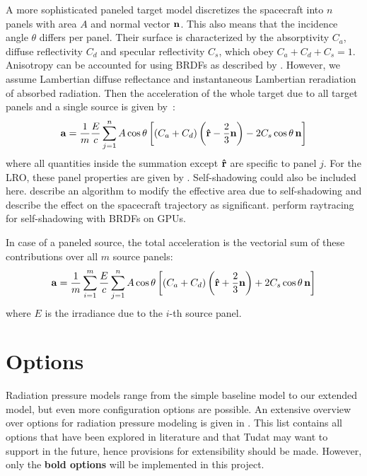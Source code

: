 \documentclass[parskip=full,DIV=15]{scrartcl}
\begin{document}
A more sophisticated paneled target model discretizes the spacecraft into $n$ panels with area $A$ and normal vector $\vb n$. This also means that the incidence angle $\theta$ differs per panel. Their surface is characterized by the absorptivity $C_a$, diffuse reflectivity $C_d$ and specular reflectivity $C_s$, which obey $C_a + C_d + C_s = 1$. Anisotropy can be accounted for using BRDFs as described by \textcite{Wetterer2014}. However, we assume Lambertian diffuse reflectance and instantaneous Lambertian reradiation of absorbed radiation.  Then the acceleration of the whole target due to all target panels and a single source is given by~\cite{Montenbruck2014}:
\begin{align}
   \vb a = \frac{1}{m} \frac{E}{c} \sum_{j=1}^n A \cos\theta \left[(C_a + C_d)\left(\vu r - \frac{2}{3} \vb n\right) - 2 C_s \cos\theta \, \vb n \right]
\end{align}
where all quantities inside the summation except $\vu r$ are specific to panel $j$. For the LRO, these panel properties are given by \textcite{Smith2008}. Self-shadowing could also be included here. \textcite{Mazarico2009} describe an algorithm to modify the effective area due to self-shadowing and describe the effect on the spacecraft trajectory as significant. \textcite{Kenneally2020} perform raytracing for self-shadowing with BRDFs on GPUs.

In case of a paneled source, the total acceleration is the vectorial sum of these contributions over all $m$ source panels:
\begin{align}
   \vb a = \frac{1}{m} \sum_{i=1}^m \frac{E}{c} \sum_{j=1}^n A \cos\theta \left[(C_a + C_d)\left(\vu r + \frac{2}{3} \vb n\right) + 2 C_s \cos\theta \, \vb n \right]
\end{align}
where $E$ is the irradiance due to the $i$-th source panel.







\section{Options}
Radiation pressure models range from the simple baseline model to our extended model, but even more configuration options are possible. An extensive overview over options for radiation pressure modeling is given in \cite[Sec.~2]{Vielberg2020}. This list contains all options that have been explored in literature and that Tudat may want to support in the future, hence provisions for extensibility should be made. However, only the \textbf{bold options} will be implemented in this project.
\end{document}
